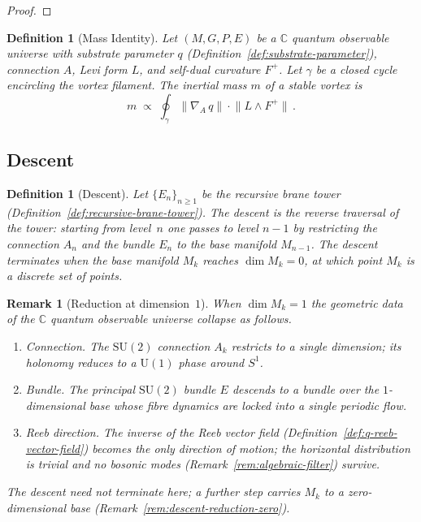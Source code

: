 \documentclass[12pt,a4paper]{report}
\newtheorem{definition}[theorem]{Definition}
\newtheorem{remark}[theorem]{Remark}
\begin{document}
\begin{proof}
\end{proof}

\begin{definition}[Mass Identity]
\label{def:mass-identity}
Let $(M, G, P, E)$ be a $\mathbb{C}$ quantum observable universe with substrate
parameter $q$ (Definition~\ref{def:substrate-parameter}), connection $A$, Levi
form $L$, and self-dual curvature $F^+$.  Let $\gamma$ be a closed cycle
encircling the vortex filament.  The \emph{inertial mass} $m$ of a stable
vortex is
\[
  m \;\propto\; \oint_\gamma \lVert \nabla_A\, q \rVert
               \cdot \lVert L \wedge F^+ \rVert\,.
\]
\end{definition}



\subsection{Descent}
\label{ssec:descent}

\begin{definition}[Descent]
\label{def:descent}
Let $\{E_n\}_{n \geq 1}$ be the recursive brane tower
(Definition~\ref{def:recursive-brane-tower}).  The \emph{descent} is the
reverse traversal of the tower: starting from level~$n$ one passes to level
$n-1$ by restricting the connection $A_n$ and the bundle $E_n$ to the base
manifold $M_{n-1}$.  The descent terminates when the base manifold $M_k$
reaches $\dim M_k = 0$, at which point $M_k$ is a discrete set of points.
\end{definition}

\begin{remark}[Reduction at dimension~$1$]
\label{rem:descent-reduction}
When $\dim M_k = 1$ the geometric data of the $\mathbb{C}$ quantum observable
universe collapse as follows.
\begin{enumerate}
  \item \emph{Connection.}  The $\mathrm{SU}(2)$ connection $A_k$ restricts to
        a single dimension; its holonomy reduces to a $\mathrm{U}(1)$ phase
        around $S^1$.
  \item \emph{Bundle.}  The principal $\mathrm{SU}(2)$ bundle $E$ descends to a
        bundle over the $1$-dimensional base whose fibre dynamics are locked
        into a single periodic flow.
  \item \emph{Reeb direction.}  The inverse of the Reeb vector field
        (Definition~\ref{def:q-reeb-vector-field}) becomes the only direction
        of motion; the horizontal distribution is trivial and no bosonic modes
        (Remark~\ref{rem:algebraic-filter}) survive.
\end{enumerate}
The descent need not terminate here; a further step carries $M_k$ to a
zero-dimensional base (Remark~\ref{rem:descent-reduction-zero}).
\end{remark}
\end{document}
